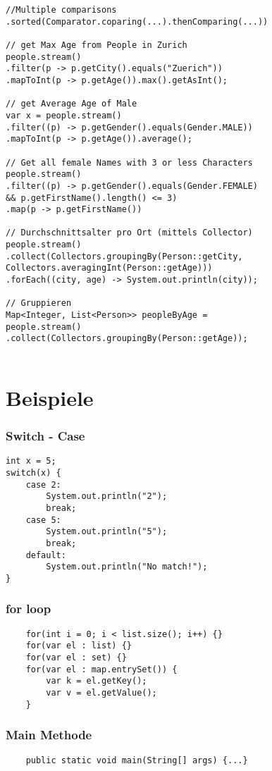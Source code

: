 \begin{multicols*}{5}
\begin{lstlisting}
//Multiple comparisons
.sorted(Comparator.coparing(...).thenComparing(...))

// get Max Age from People in Zurich
people.stream()
.filter(p -> p.getCity().equals("Zuerich"))
.mapToInt(p -> p.getAge()).max().getAsInt();

// get Average Age of Male
var x = people.stream()
.filter((p) -> p.getGender().equals(Gender.MALE))
.mapToInt(p -> p.getAge()).average();

// Get all female Names with 3 or less Characters
people.stream()
.filter((p) -> p.getGender().equals(Gender.FEMALE) 
&& p.getFirstName().length() <= 3)
.map(p -> p.getFirstName())

// Durchschnittsalter pro Ort (mittels Collector)
people.stream()
.collect(Collectors.groupingBy(Person::getCity, Collectors.averagingInt(Person::getAge)))
.forEach((city, age) -> System.out.println(city));

// Gruppieren
Map<Integer, List<Person>> peopleByAge = 
people.stream()
.collect(Collectors.groupingBy(Person::getAge));
		
	\end{lstlisting}

\section{Beispiele}

	\subsubsection{Switch - Case}
	\begin{lstlisting}
int x = 5; 
switch(x) {
	case 2: 
		System.out.println("2"); 
		break;
	case 5: 
		System.out.println("5"); 
		break;
	default: 
		System.out.println("No match!"); 
}
	\end{lstlisting}

	\subsubsection{for loop}
	\begin{lstlisting}
	for(int i = 0; i < list.size(); i++) {}
	for(var el : list) {}
	for(var el : set) {}
	for(var el : map.entrySet()) {
		var k = el.getKey();
		var v = el.getValue();
	}
	\end{lstlisting}

	\subsubsection{Main Methode}
	\begin{lstlisting}
	public static void main(String[] args) {...}	
	\end{lstlisting}


\end{multicols*}
